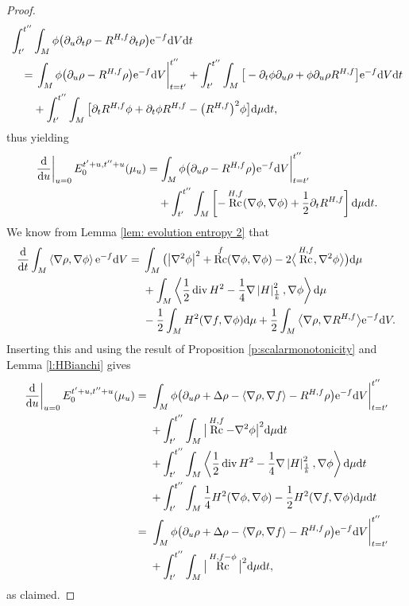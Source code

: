 \documentclass[pdftex]{sigma}
\numberwithin{equation}{section}
\newcommand{\del}{\partial}
\newcommand{\N}{\nabla}
\newcommand{\IP}[1]{\left<#1\right>}
\newcommand{\wnorm}[1]{\left|#1\right|^2_{\frac1k}}
\DeclareMathOperator{\Rc}{Rc}
\DeclareMathOperator{\divg}{div}
\begin{document}
\begin{proof}
\begin{align*}
&\int_{t'}^{t''}\int_M \phi\big(\del_u\del_t\rho-R^{H,f}\del_t\rho\big){\rm e}^{-f} {\rm d}V{\rm d}t\\
&\quad=\left.\int_M \phi\big(\del_u\rho-R^{H,f}\rho\big){\rm e}^{-f} {\rm d}V\right|_{t=t'}^{t''}+\int_{t'}^{t''}\int_M \big[-\del_t\phi\del_u\rho+\phi\del_u\rho R^{H,f} \big]{\rm e}^{-f} {\rm d}V{\rm d}t\\
&\phantom{\quad={}}{}+\int_{t'}^{t''}\int_M \big[\del_t R^{H,f}\phi+\del_t\phi R^{H,f}-\big(R^{H,f}\big)^2\phi \big] {\rm d}\mu {\rm d}t,
\end{align*}
thus yielding
\begin{align*}
\left. \frac{{\rm d}}{{\rm d}u} \right|_{u=0} E_0^{t'+u,t''+u}(\mu_u)=&\left.\int_M \phi\big(\del_u\rho-R^{H,f}\rho\big){\rm e}^{-f} {\rm d}V\right|_{t=t'}^{t''} \\
&+ \int_{t'}^{t''}\int_M \left[ - \Rc^{H,f}(\N\phi,\N\phi) + \frac{1}{2} \del_t R^{H,f} \right] {\rm d}\mu {\rm d}t.
\end{align*}
We know from Lemma \ref{lem: evolution entropy 2} that
\begin{align*}
	\frac{{\rm d}}{{\rm d}t} \int_M \IP{\N\rho,\N\phi}{\rm e}^{-f} {\rm d}V={}&\int_M \big(\big|\N^2\phi\big|^2+\Rc^f(\N\phi,\N\phi)-2\big\langle\Rc^{H,f},\N^2\phi\big\rangle\big) {\rm d}\mu\\
	&+\int_M \IP{\frac12\divg H^2- \frac1{4}\N\wnorm{H},\N \phi} {\rm d}\mu \\
	&-\frac12\int_M H^2(\N f,\N\phi) {\rm d}\mu+\frac12\int_M \big\langle\N\rho,\N R^{H,f}\big\rangle{\rm e}^{-f} {\rm d}V.
	\end{align*}
	Inserting this and using the result of Proposition \ref{p:scalarmonotonicity} and Lemma \ref{l:HBianchi} gives
	\begin{align*}
\left. \frac{{\rm d}}{{\rm d}u} \right|_{u=0} E_0^{t'+u,t''+u}(\mu_u)={}&\left.\int_M \phi\big(\del_u\rho+\Delta \rho-\IP{\N\rho,\N f}-R^{H,f}\rho\big){\rm e}^{-f} {\rm d}V\right|_{t=t'}^{t''}\\
& +\int_{t'}^{t''}\int_M \big|\Rc^{H,f}-\N^2\phi\big|^2 {\rm d}\mu {\rm d}t \\
& +\int_{t'}^{t''}\int_M \IP{\frac12\divg H^2-\frac1{4}\N\wnorm{H},\N\phi} {\rm d}\mu {\rm d}t\\
& +\int_{t'}^{t''}\int_M \frac14 H^2(\N\phi,\N\phi)-\frac12 H^2(\N f,\N\phi) {\rm d}\mu {\rm d}t\\
={}&\left.\int_M \phi\big(\del_u\rho+\Delta \rho-\IP{\N\rho,\N f}-R^{H,f}\rho\big){\rm e}^{-f} {\rm d}V\right|_{t=t'}^{t''} \\
& +\int_{t'}^{t''}\int_M \big|\Rc^{H,f-\phi}\big|^2 {\rm d}\mu {\rm d}t,
\end{align*}
as claimed.
\end{proof}
\end{document}

